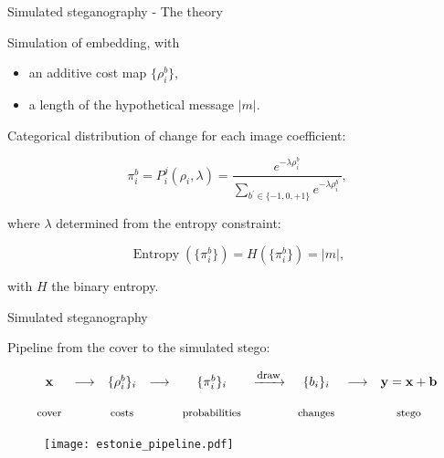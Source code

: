 \documentclass[10pt,aspectratio=169]{beamer}
\begin{document}
\begin{frame}{Simulated steganography - The theory}

    Simulation of embedding, with
    \begin{itemize}
        \item an additive cost map $\{\rho_i^b\}$, 
        \item a length of the hypothetical message $|m|$. 
    \end{itemize}

    \pause 
    Categorical distribution of change for each image coefficient:

    \begin{equation}
        \pi_{i}^b = P_i^j\left(\rho_{i}, \lambda\right) = \frac{e^{-\lambda \rho_{i}^{b}}}{\sum_{b^{\prime} \in \{-1,0,+1\}} e^{-\lambda \rho_{i}^{b^{\prime}}}},
    \end{equation}

    \pause
    where $\lambda$ determined from the entropy constraint:

    \begin{equation}
        \operatorname{Entropy}(\{\pi_i^b\}) = H(\{\pi_i^b\}) = |m|,
    \end{equation}

    with $H$ the binary entropy.

\end{frame}


\begin{frame}{Simulated steganography}

    Pipeline from the cover to the simulated stego:

    \begin{equation*}
        \begin{array}{ccccccccc}
            \mathbf{x} & \longrightarrow & \{\rho^b_i\}_i & \longrightarrow & \{\pi_i^b\}_i &   \xrightarrow{\mbox{\footnotesize{draw}}} & \{b_i\}_i &  \longrightarrow & \mathbf{y} = \mathbf{x} + \mathbf{b} \\ \\
            \mbox{\footnotesize{cover}} & & \mbox{\footnotesize{costs}} & & \mbox{\footnotesize{probabilities}} & & \mbox{\footnotesize{changes}} & &  \mbox{\footnotesize{stego}}
        \end{array}
    \end{equation*}

    \begin{figure}[h]
        \centerline{\texttt{[image: estonie\_pipeline.pdf]}}
    \end{figure}


\end{frame}
\end{document}

